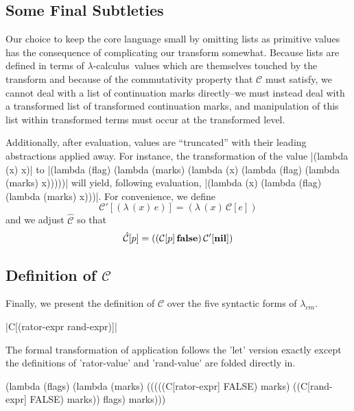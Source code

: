 \documentclass{llncs}
\newcommand{\cm}[0]{$\lambda_{cm}$}
\newcommand{\lc}[0]{$\lambda$-calculus}
\newcommand{\app}[2]{(#1\,#2)}
\newcommand{\abs}[2]{(\lambda\,(#1)\,#2)}
\newcommand{\C}[1]{\mathcal{C}[#1]}
\newcommand{\Cp}[1]{\mathcal{C}'[#1]}
\newcommand{\Ch}[1]{\hat{\mathcal{C}}[#1]}
\begin{document}
\subsection{Some Final Subtleties}

Our choice to keep the core language small by omitting lists as primitive values has the consequence of complicating our transform somewhat. Because lists are defined in terms of \lc\ values which are themselves touched by the transform and because of the commutativity property that $\mathcal{C}$ must satisfy, we cannot deal with a list of continuation marks directly--we must instead deal with a transformed list of transformed continuation marks, and manipulation of this list within transformed terms must occur at the transformed level.

Additionally, after evaluation, values are ``truncated'' with their leading abstractions applied away. For instance, the transformation of the value \scheme|(lambda (x) x)| to \scheme|(lambda (flag) (lambda (marks) (lambda (x) (lambda (flag) (lambda (marks) x)))))| will yield, following evaluation, \scheme|(lambda (x) (lambda (flag) (lambda (marks) x)))|. For convenience, we define 
\begin{equation}
\Cp{\abs{x}{e}}=\abs{x}{\C{e}}
\end{equation}
and we adjust $\hat{\mathcal{C}}$ so that
\begin{equation}
\Ch{p}=\app{\app{\C{p}}{\false}}{\Cp{\nil}}
\end{equation}


\newenvironment{schemedefn}[1]{\begin{plaindef}#1}{\end{plaindef}}
\newenvironment{namedschemedefn}[2]{\begin{plaindef}\label{#1}$#2$}{\end{plaindef}}

\subsection{Definition of $\mathcal{C}$}

Finally, we present the definition of $\mathcal{C}$ over the five syntactic forms of \cm.

\begin{schemedefn}{\scheme|C[(rator-expr rand-expr)]|}

The formal transformation of application follows the \scheme'let' version exactly except the definitions of \scheme'rator-value' and \scheme'rand-value' are folded directly in.
\begin{schemedisplay}
(lambda (flags)
  (lambda (marks)
    (((((C[rator-expr] FALSE) marks)
       ((C[rand-expr] FALSE) marks))
      flags)
     marks)))
\end{schemedisplay}
\end{schemedefn}
\end{document}
